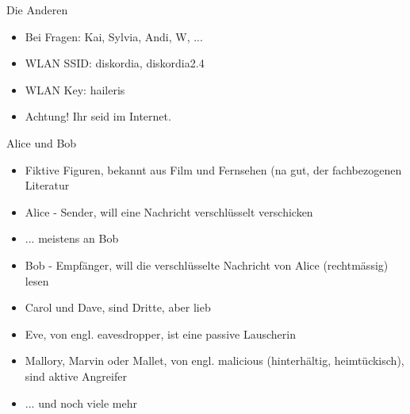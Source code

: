   \begin{frame}{Die Anderen}
    \begin{itemize}
      \item{Bei Fragen: Kai, Sylvia, Andi, W, ...}
      \item{WLAN SSID: diskordia, diskordia2.4}
      \item{WLAN Key: haileris}
      \item{Achtung! Ihr seid im Internet.}
    \end{itemize}
  \end{frame}
  \begin{frame}{Alice und Bob}
    \begin{itemize}
      \item{Fiktive Figuren, bekannt aus Film und Fernsehen (na gut, der fachbezogenen Literatur}
      \item{Alice - Sender, will eine Nachricht verschlüsselt verschicken}
      \item{... meistens an Bob}
      \item{Bob - Empfänger, will die verschlüsselte Nachricht von Alice (rechtmässig) lesen}
      \item{Carol und Dave, sind Dritte, aber lieb}
      \item{Eve, von engl. eavesdropper, ist eine passive Lauscherin}
      \item{Mallory, Marvin oder Mallet, von engl. malicious (hinterhältig, heimtückisch), sind aktive Angreifer}
      \item{... und noch viele mehr}
    \end{itemize}
  \end{frame}
